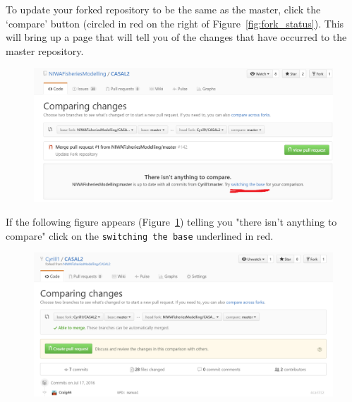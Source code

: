 To update your forked repository to be the same as the master, click the `compare' button (circled in red on the right of Figure~\ref{fig:fork_status}). This will bring up a page that will tell you of the changes that have occurred to the master repository. 
\clearpage
\begin{figure}[!ht]
	\includegraphics[scale=0.6]{Figures/Compare_fork3.png}
	\caption{}\label{fig:fork_compare1}
\end{figure}

If the following figure appears (Figure~\ref{fig:fork_compare1}) telling you "there isn't anything to compare" click on the \texttt{switching the base} underlined in red.
\raggedbottom
\begin{figure}[!ht]
	\includegraphics[scale=0.6]{Figures/Compare_fork4.png}
	\caption{}\label{fig:fork_compare2}
\end{figure}

